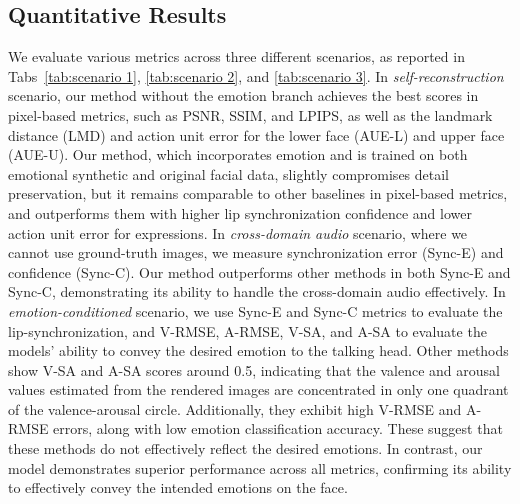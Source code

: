 
\subsection{Quantitative Results}
We evaluate various metrics across three different scenarios, as reported in Tabs~\ref{tab:scenario 1}, \ref{tab:scenario 2}, and \ref{tab:scenario 3}. In \emph{self-reconstruction} scenario, our method without the emotion branch achieves the best scores in pixel-based metrics, such as PSNR, SSIM, and LPIPS, as well as the landmark distance (LMD) and action unit error for the lower face (AUE-L) and upper face (AUE-U). Our method, which incorporates emotion and is trained on both emotional synthetic and original facial data, slightly compromises detail preservation, but it remains comparable to other baselines in pixel-based metrics, and outperforms them with higher lip synchronization confidence and lower action unit error for expressions. In \emph{cross-domain audio} scenario, where we cannot use ground-truth images, we measure synchronization error (Sync-E) and confidence (Sync-C). Our method outperforms other methods in both Sync-E and Sync-C, demonstrating its ability to handle the cross-domain audio effectively. In \emph{emotion-conditioned} scenario, we use Sync-E and Sync-C metrics to evaluate the lip-synchronization, and V-RMSE, A-RMSE, V-SA, and A-SA to evaluate the models' ability to convey the desired emotion to the talking head. Other methods show V-SA and A-SA scores around 0.5, indicating that the valence and arousal values estimated from the rendered images are concentrated in only one quadrant of the valence-arousal circle. Additionally, they exhibit high V-RMSE and A-RMSE errors, along with low emotion classification accuracy. These suggest that these methods do not effectively reflect the desired emotions. In contrast, our model demonstrates superior performance across all metrics, confirming its ability to effectively convey the intended emotions on the face.

